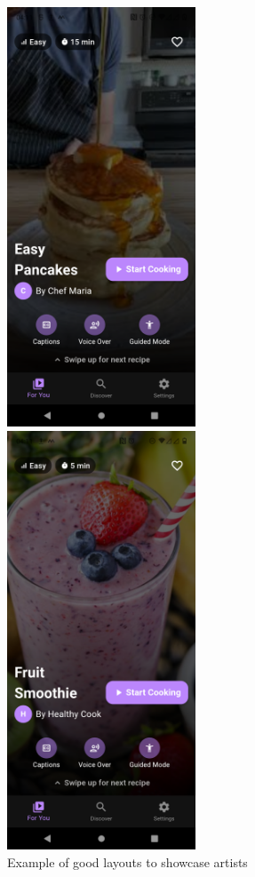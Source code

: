 \documentclass[]{project_final}
\begin{document}
\begin{figure}[ht!]
  \centering
  \begin{minipage}[t]{0.4\textwidth}
    \includegraphics[width=0.5\textwidth]{fyp1.png}
  \end{minipage}
  \hfill
  \begin{minipage}[t]{0.4\textwidth}
    \includegraphics[width=0.5\textwidth]{fyp2.png}
  \end{minipage}
  \caption{Example of good layouts to showcase artists}
  \label{fig:1}
\end{figure}
\end{document}
